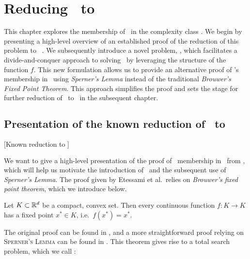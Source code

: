 \setchapterpreamble[u]{\margintoc}
\chapter{Reducing \Tarski\ to \PPAD}
\label{ch:ppad_reduction}

This chapter explores the membership of \Tarski\ in the complexity class \PPAD. We begin by presenting a high-level overview of an established proof of the reduction of this problem to \Brouwer~\cite{etessami_tarskis_2020}. We subsequently introduce a novel problem, \Tarskistar, which facilitates a divide-and-conquer approach to solving \Tarski\ by leveraging the structure of the function $f$. This new formulation allows us to provide an alternative proof of \Tarski's membership in \PPAD\ using \textit{Sperner's Lemma} instead of the traditional \textit{Brouwer's Fixed Point Theorem}. This approach simplifies the proof and sets the stage for further reduction of \Tarskistar\ to \EOPL\ in the subsequent chapter.

\section{Presentation of the known reduction of \Tarski\ to \PPAD}[Known reduction to \PPAD]

We want to give a high-level presentation of the proof of \Tarski\ membership in \PPAD\ from , which will help us motivate the introduction of \Tarskistar\ and the subsequent use of \textit{Sperner's Lemma}. The proof given by Etessami et al.\ relies on \textit{Brouwer's fixed point theorem}, which we introduce below.

\begin{theorem}
	Let $K \subset \mathbb{R}^d$ be a compact, convex set. Then every continuous function $f : K \rightarrow K$ has a fixed point $x^*  \in K$, i.e.\ $f(x^*) = x^*$.
\end{theorem}

The original proof can be found in , and a more straightforward proof relying on \textsc{Sperner's Lemma} can be found in . This theorem gives rise to a total search problem, which we call \Brouwer:

